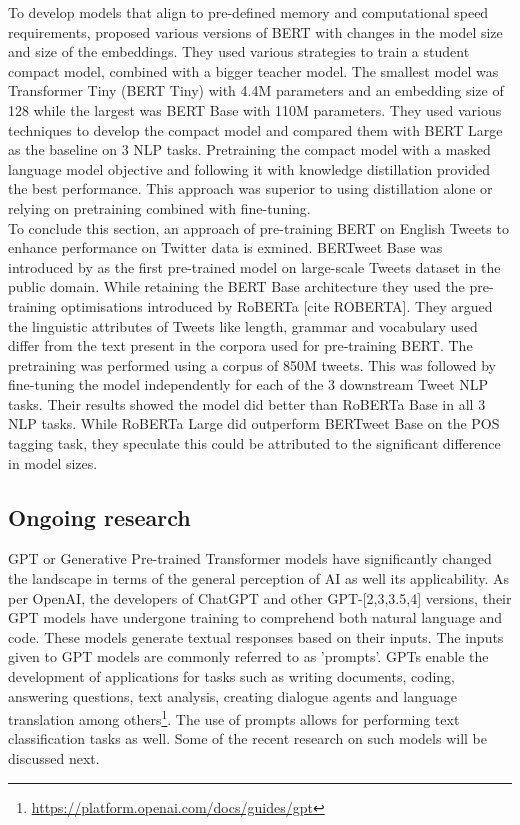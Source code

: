 To develop models that align to pre-defined memory and computational speed requirements, \cite{turcWellReadStudentsLearn2019} proposed various versions of BERT with changes in the model size and size of the embeddings. They used various strategies to train a student compact model, combined with a bigger teacher model. The smallest model was Transformer Tiny (BERT Tiny) with  4.4M parameters and an embedding size of 128 while the largest was BERT Base with 110M parameters. They used various techniques to develop the compact model and compared them with BERT Large as the baseline on 3 NLP tasks. Pretraining the compact model with a masked language model objective and following it with knowledge distillation provided the best performance. This approach was superior to using distillation alone or relying on pretraining combined with fine-tuning.\\

To conclude this section, an approach of pre-training BERT on English Tweets to enhance performance on Twitter data is exmined. BERTweet Base was introduced by \cite{nguyenBERTweetPretrainedLanguage2020} as the first pre-trained model on large-scale Tweets dataset in the public domain. While retaining the BERT Base architecture they used the pre-training optimisations introduced by RoBERTa [cite ROBERTA]. They argued the linguistic attributes of Tweets like length, grammar and vocabulary used differ from the text present in the corpora used for pre-training BERT. The pretraining was performed using a corpus of 850M tweets. This was followed by fine-tuning the model independently for each of the 3 downstream Tweet NLP tasks. Their results showed the model did better than RoBERTa Base in all 3 NLP tasks. While RoBERTa Large did outperform BERTweet Base on the POS tagging task, they speculate this could be attributed to the significant difference in model sizes.

\subsection{Ongoing research}
GPT or Generative Pre-trained Transformer models have significantly changed the landscape in terms of the general perception of AI as well its applicability. As per OpenAI, the developers of ChatGPT and other GPT-[2,3,3.5,4] versions, their GPT models have undergone training to comprehend both natural language and code. These models generate textual responses based on their inputs. The inputs given to GPT models are commonly referred to as 'prompts'. GPTs enable the development of applications for tasks such as writing documents, coding, answering questions, text analysis, creating dialogue agents and language translation among others\footnote{\url{https://platform.openai.com/docs/guides/gpt}}. The use of prompts allows for performing text classification tasks as well. Some of the recent research on such models will be discussed next.\\

